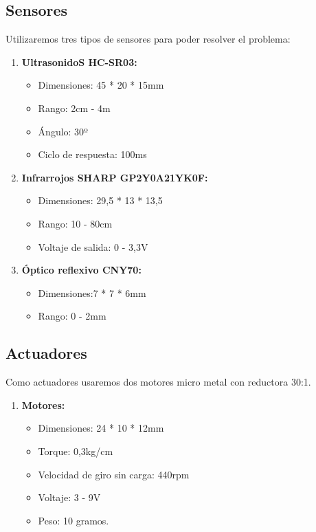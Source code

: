 \subsection{Sensores}
Utilizaremos tres tipos de sensores para poder resolver el problema:
\begin{enumerate}
	\item \textbf{UltrasonidoS HC-SR03:}
	\begin{itemize}
		\item Dimensiones: 45 * 20 * 15mm
		\item Rango: 2cm - 4m
		\item Ángulo: 30º
		\item Ciclo de respuesta: 100ms
	\end{itemize}
	\item \textbf{Infrarrojos SHARP GP2Y0A21YK0F:}
	\begin{itemize}
		\item Dimensiones: 29,5 * 13 * 13,5
		\item Rango: 10 - 80cm
		\item Voltaje de salida: 0 - 3,3V 
	\end{itemize}
	\item \textbf{Óptico reflexivo CNY70:}
	\begin{itemize}
		\item Dimensiones:7 * 7 * 6mm
		\item Rango: 0 - 2mm
	\end{itemize}
\end{enumerate}
\subsection{Actuadores}
Como actuadores usaremos dos motores micro metal con reductora 30:1.
\begin{enumerate}
	\item \textbf{Motores:}
	\begin{itemize}
		\item Dimensiones: 24 * 10 * 12mm
		\item Torque: 0,3kg/cm
		\item Velocidad de giro sin carga: 440rpm
		\item Voltaje: 3 - 9V
		\item Peso: 10 gramos.
	\end{itemize}
\end{enumerate}
